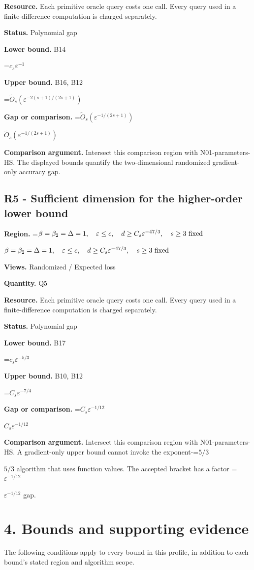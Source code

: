 \documentclass[10pt,a4paper]{article}
\newcommand{\AtlasMath}[1]{\par\begingroup\centering\setbox0=\hbox{$\displaystyle #1$}\ifdim\wd0>1.4\linewidth\typeout{ATLAS WIDE FORMULA: \the\wd0}\fi\ifdim\wd0>\linewidth\resizebox{\linewidth}{!}{\box0}\else\box0\fi\par\endgroup}
\newcommand{\AtlasInlineMath}[1]{\begingroup\setbox0=\hbox{$#1$}\ifdim\wd0>.4\linewidth\endgroup\AtlasMath{#1}\else\endgroup$#1$\fi}
\begin{document}
\textbf{Resource.} Each primitive oracle query costs one call. Every query used in a finite-difference computation is charged separately.

\textbf{Status.} Polynomial gap

\textbf{Lower bound.} B14

\AtlasMath{c_s\varepsilon^{-1}}
\textbf{Upper bound.} B16, B12

\AtlasMath{\widetilde{O}_s(\varepsilon^{-2(s+1)/(2s+1)})}
\textbf{Gap or comparison.} \AtlasInlineMath{\widetilde{O}_s(\varepsilon^{-1/(2s+1)})}

\textbf{Comparison argument.} Intersect this comparison region with N01-parameters-HS. The displayed bounds quantify the two-dimensional randomized gradient-only accuracy gap.

\subsection{R5 - Sufficient dimension for the higher-order lower bound}
\textbf{Region.} \AtlasInlineMath{\beta=\beta_2=\Delta=1,\quad\varepsilon\le c,\quad d\ge C_s\varepsilon^{-47/3},\quad s\ge3\text{ \text{fixed}}}

\textbf{Views.} Randomized / Expected loss

\textbf{Quantity.} Q5

\textbf{Resource.} Each primitive oracle query costs one call. Every query used in a finite-difference computation is charged separately.

\textbf{Status.} Polynomial gap

\textbf{Lower bound.} B17

\AtlasMath{c_s\varepsilon^{-5/3}}
\textbf{Upper bound.} B10, B12

\AtlasMath{C_s\varepsilon^{-7/4}}
\textbf{Gap or comparison.} \AtlasInlineMath{C_s\varepsilon^{-1/12}}

\textbf{Comparison argument.} Intersect this comparison region with N01-parameters-HS. A gradient-only upper bound cannot invoke the exponent-\AtlasInlineMath{5/3} algorithm that uses function values. The accepted bracket has a factor \AtlasInlineMath{\varepsilon^{-1/12}} gap.

\section{4. Bounds and supporting evidence}
The following conditions apply to every bound in this profile, in addition to each bound's stated region and algorithm scope.
\end{document}
